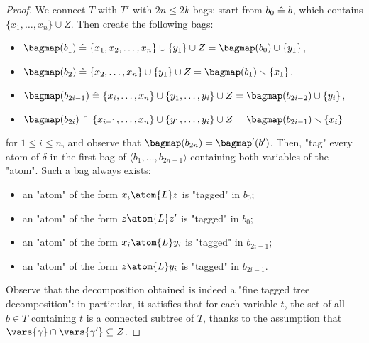 \begin{proof}
   	We connect $T$ with $T'$ with $2n \leq 2k$ bags:
    start from $b_0 \mathrel{\hat{=}} b$, which contains $\{x_1,\dotsc,x_n\}\cup Z$. Then create
    the following bags:
    \begin{itemize}
        \item $\bagmap(b_1) \defeq \{x_1,x_2,\dotsc,x_n\}\cup\{y_1\}\cup Z
            = \bagmap(b_0) \cup \{y_1\}$, 
        \item $\bagmap(b_2) \defeq \{x_2,\dotsc,x_n\}\cup\{y_1\}\cup Z
            = \bagmap(b_1) \smallsetminus \{x_1\}$,
        \item $\bagmap(b_{2i-1}) \defeq \{x_i,\dotsc,x_n\}\cup\{y_1,\dotsc,y_i\}\cup Z
            = \bagmap(b_{2i-2}) \cup \{y_i\}$,
        \item $\bagmap(b_{2i}) \defeq \{x_{i+1},\dotsc,x_n\}\cup\{y_1,\dotsc,y_i\}\cup Z
            = \bagmap(b_{2i-1}) \smallsetminus \{x_i\}$
    \end{itemize}
    for $1 \leq i \leq n$, and observe that $\bagmap(b_{2n}) = \bagmap'(b')$.
    Then, "tag" every atom of $\delta$ in the first bag of
	$\langle b_1, \dotsc, b_{2n-1} \rangle$ containing both variables of the "atom".
	Such a bag always exists:
	\begin{itemize}
		\item an "atom" of the form $x_i \atom{L} z$ is "tagged" in $b_0$;
		\item an "atom" of the form $z \atom{L} z'$ is "tagged" in $b_0$;
		\item an "atom" of the form $x_i \atom{L} y_i$ is "tagged" in $b_{2i-1}$;
		\item an "atom" of the form $z \atom{L} y_i$ is "tagged" in $b_{2i-1}$.
	\end{itemize}
	Observe that the decomposition obtained is indeed a "fine tagged tree decomposition":
	in particular, it satisfies that for each variable $t$, the set of all $b \in T$
	containing $t$ is a connected subtree of $T$, thanks to the assumption that
	$\vars{\gamma} \cap \vars{\gamma'} \subseteq Z$.
\end{proof} 